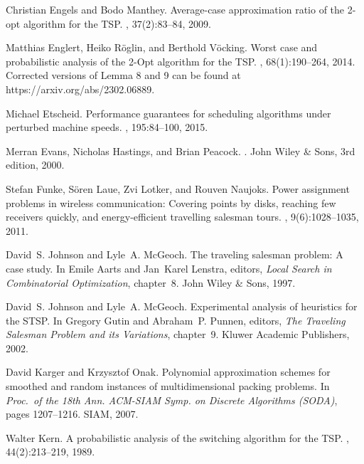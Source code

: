 \documentclass[11pt,DIV=12,a4paper]{scrartcl}
\begin{document}
\begin{thebibliography}{10}
Christian Engels and Bodo Manthey.
\newblock Average-case approximation ratio of the 2-opt algorithm for the
  {TSP}.
, 37(2):83--84, 2009.

Matthias Englert, Heiko R{\"o}glin, and Berthold V{\"o}cking.
\newblock Worst case and probabilistic analysis of the {2-Opt} algorithm for
  the {TSP}.
, 68(1):190--264, 2014.
\newblock Corrected versions of Lemma 8 and 9 can be found at
  https://arxiv.org/abs/2302.06889.

Michael Etscheid.
\newblock Performance guarantees for scheduling algorithms under perturbed
  machine speeds.
, 195:84--100, 2015.

Merran Evans, Nicholas Hastings, and Brian Peacock.
.
\newblock John Wiley \& Sons, 3rd edition, 2000.

Stefan Funke, S{\"o}ren Laue, Zvi Lotker, and Rouven Naujoks.
\newblock Power assignment problems in wireless communication: Covering points
  by disks, reaching few receivers quickly, and energy-efficient travelling
  salesman tours.
, 9(6):1028--1035, 2011.

David~S. Johnson and Lyle~A. McGeoch.
\newblock The traveling salesman problem: A case study.
\newblock In Emile Aarts and Jan~Karel Lenstra, editors, {\em Local Search in
  Combinatorial Optimization}, chapter~8. John Wiley \& Sons, 1997.

David~S. Johnson and Lyle~A. McGeoch.
\newblock Experimental analysis of heuristics for the {STSP}.
\newblock In Gregory Gutin and Abraham~P. Punnen, editors, {\em The Traveling
  Salesman Problem and its Variations}, chapter~9. Kluwer Academic Publishers,
  2002.

David Karger and Krzysztof Onak.
\newblock Polynomial approximation schemes for smoothed and random instances of
  multidimensional packing problems.
\newblock In {\em Proc.\ of the 18th Ann. ACM-SIAM Symp. on Discrete Algorithms
  (SODA)}, pages 1207--1216. SIAM, 2007.

Walter Kern.
\newblock A probabilistic analysis of the switching algorithm for the {TSP}.
, 44(2):213--219, 1989.


\end{thebibliography}
\end{document}
